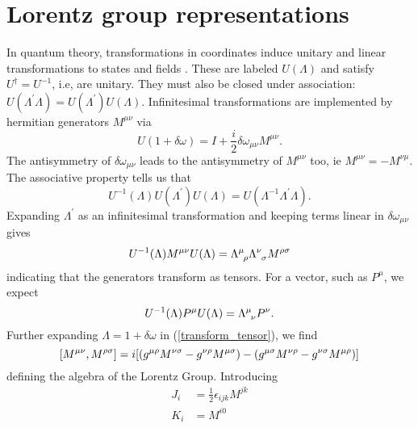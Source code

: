 \section{Lorentz group representations}
In quantum theory, transformations in coordinates induce unitary and linear transformations to states and fields \cite{weinberg1995quantum}. These are labeled $U(\Lambda)$ and satisfy $U^\dagger=U^{-1}$, i.e, are unitary. They must also be closed under association: $U(\Lambda^\prime\Lambda)=U(\Lambda^\prime)U(\Lambda)$. Infinitesimal transformations are implemented by hermitian generators $M^{\mu\nu}$ via
\begin{equation}
   U(1+\delta\omega)=I+\frac{i}{2}\delta\omega_{\mu\nu}M^{\mu\nu}.
   \label{infinitesimalU}
\end{equation}
The antisymmetry of $\delta\omega_{\mu\nu}$ leads to the antisymmetry of $M^{\mu\nu}$ too, ie $M^{\mu\nu}=-M^{\nu\mu}$. The associative property tells us that
\begin{equation}
    U^{-1}(\Lambda)U(\Lambda^\prime)U(\Lambda)=U(\Lambda^{-1}\Lambda^\prime\Lambda).
    \label{associative}
\end{equation}
Expanding $\Lambda^\prime$ as an infinitesimal transformation and keeping terms linear in $\delta\omega_{\mu\nu}$  gives
\begin{equation}
    U^{-1}(\Lambda)M^{\mu\nu}U(\Lambda)=\ten{\Lambda}{\mu}{\rho}\ten{\Lambda}{\nu}{\sigma}M^{\rho\sigma}
    \label{transform_tensor}
\end{equation}
indicating that the generators transform as tensors. For a vector, such as $P^\mu$, we expect
\begin{equation}
    U^{-1}(\Lambda)P^{\mu}U(\Lambda)=\ten{\Lambda}{\mu}{\nu}P^\nu.
    \label{transform_vector}
\end{equation}
Further expanding $\Lambda=1+\delta\omega$ in (\ref{transform_tensor}), we find
\begin{equation}
    \comm{M^{\mu\nu}}{M^{\rho\sigma}}=i[(g^{\mu\rho}M^{\nu\sigma}-g^{\nu\rho}M^{\mu\sigma})-(g^{\mu\sigma}M^{\nu\rho}-g^{\nu\sigma}M^{\mu\rho})]
    \label{Lorentz_algebra_M}
\end{equation}
defining the algebra of the Lorentz Group. Introducing 
\begin{equation}
    \begin{aligned}
    J_i&=\frac{1}{2}\epsilon_{ijk}M^{jk}\\
    K_i&=M^{i0}
    \end{aligned}
\end{equation}
